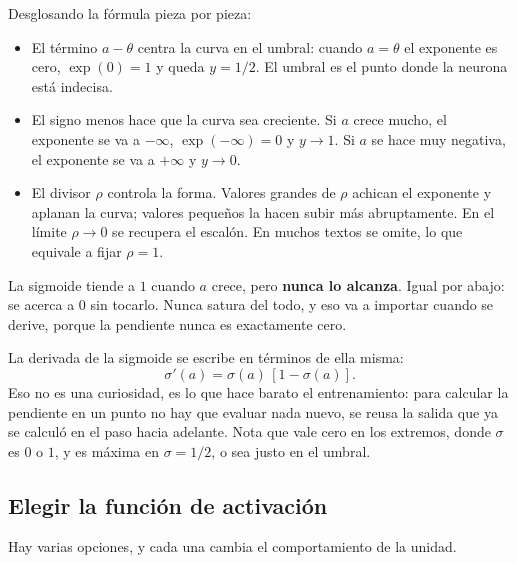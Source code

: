 \documentclass[11pt,letterpaper]{article}
\begin{document}
Desglosando la fórmula pieza por pieza:

\begin{itemize}[itemsep=0.25em]
  \item El término $a - \theta$ centra la curva en el umbral: cuando
        $a = \theta$ el exponente es cero, $\exp(0) = 1$ y queda
        $y = 1/2$. El umbral es el punto donde la neurona está
        indecisa.
  \item El signo menos hace que la curva sea creciente. Si $a$ crece
        mucho, el exponente se va a $-\infty$, $\exp(-\infty) = 0$ y
        $y \to 1$. Si $a$ se hace muy negativa, el exponente se va a
        $+\infty$ y $y \to 0$.
  \item El divisor $\rho$ controla la forma. Valores grandes de
        $\rho$ achican el exponente y aplanan la curva; valores
        pequeños la hacen subir más abruptamente. En el límite
        $\rho \to 0$ se recupera el escalón. En muchos textos se
        omite, lo que equivale a fijar $\rho = 1$.
\end{itemize}

\begin{ojo}
  La sigmoide tiende a $1$ cuando $a$ crece, pero \textbf{nunca lo
  alcanza}. Igual por abajo: se acerca a $0$ sin tocarlo. Nunca
  satura del todo, y eso va a importar cuando se derive, porque la
  pendiente nunca es exactamente cero.
\end{ojo}

\begin{idea}
  La derivada de la sigmoide se escribe en términos de ella misma:
  \[
      \sigma'(a) = \sigma(a)\,\left[1 - \sigma(a)\right] .
  \]
  Eso no es una curiosidad, es lo que hace barato el entrenamiento:
  para calcular la pendiente en un punto no hay que evaluar nada
  nuevo, se reusa la salida que ya se calculó en el paso hacia
  adelante. Nota que vale cero en los extremos, donde $\sigma$ es $0$
  o $1$, y es máxima en $\sigma = 1/2$, o sea justo en el umbral.
\end{idea}

\subsection*{Elegir la función de activación}

Hay varias opciones, y cada una cambia el comportamiento de la
unidad.
\end{document}
